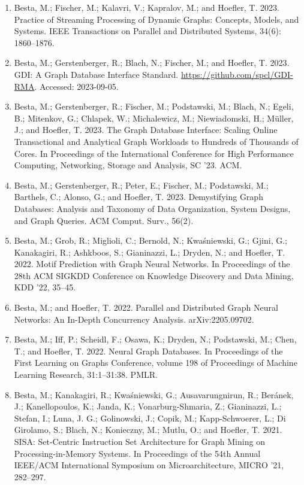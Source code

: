 \documentclass[11pt,UTF8,fontset=fandol]{ctexart}
\begin{document}
\begin{enumerate}[leftmargin=2em]
\item Besta, M.; Fischer, M.; Kalavri, V.; Kapralov, M.; and Hoefler, T. 2023. Practice of Streaming Processing of Dynamic Graphs: Concepts, Models, and Systems. IEEE Transactions on Parallel and Distributed Systems, 34(6): 1860--1876.
\item Besta, M.; Gerstenberger, R.; Blach, N.; Fischer, M.; and Hoefler, T. 2023. GDI: A Graph Database Interface Standard. \url{https://github.com/spcl/GDI-RMA}. Accessed: 2023-09-05.
\item Besta, M.; Gerstenberger, R.; Fischer, M.; Podstawski, M.; Blach, N.; Egeli, B.; Mitenkov, G.; Chlapek, W.; Michalewicz, M.; Niewiadomski, H.; Müller, J.; and Hoefler, T. 2023. The Graph Database Interface: Scaling Online Transactional and Analytical Graph Workloads to Hundreds of Thousands of Cores. In Proceedings of the International Conference for High Performance Computing, Networking, Storage and Analysis, SC '23. ACM.
\item Besta, M.; Gerstenberger, R.; Peter, E.; Fischer, M.; Podstawski, M.; Barthels, C.; Alonso, G.; and Hoefler, T. 2023. Demystifying Graph Databases: Analysis and Taxonomy of Data Organization, System Designs, and Graph Queries. ACM Comput. Surv., 56(2).
\item Besta, M.; Grob, R.; Miglioli, C.; Bernold, N.; Kwaśniewski, G.; Gjini, G.; Kanakagiri, R.; Ashkboos, S.; Gianinazzi, L.; Dryden, N.; and Hoefler, T. 2022. Motif Prediction with Graph Neural Networks. In Proceedings of the 28th ACM SIGKDD Conference on Knowledge Discovery and Data Mining, KDD '22, 35--45.
\item Besta, M.; and Hoefler, T. 2022. Parallel and Distributed Graph Neural Networks: An In-Depth Concurrency Analysis. arXiv:2205.09702.
\item Besta, M.; Iff, P.; Scheidl, F.; Osawa, K.; Dryden, N.; Podstawski, M.; Chen, T.; and Hoefler, T. 2022. Neural Graph Databases. In Proceedings of the First Learning on Graphs Conference, volume 198 of Proceedings of Machine Learning Research, 31:1--31:38. PMLR.
\item Besta, M.; Kanakagiri, R.; Kwaśniewski, G.; Ausavarungnirun, R.; Beránek, J.; Kanellopoulos, K.; Janda, K.; Vonarburg-Shmaria, Z.; Gianinazzi, L.; Stefan, I.; Luna, J. G.; Golinowski, J.; Copik, M.; Kapp-Schwoerer, L.; Di Girolamo, S.; Blach, N.; Konieczny, M.; Mutlu, O.; and Hoefler, T. 2021. SISA: Set-Centric Instruction Set Architecture for Graph Mining on Processing-in-Memory Systems. In Proceedings of the 54th Annual IEEE/ACM International Symposium on Microarchitecture, MICRO '21, 282--297.

\end{enumerate}
\end{document}
